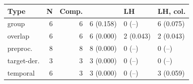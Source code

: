 \begin{tabular}{@{}lrrlll@{}}
\toprule
\textbf{Type} & \textbf{N} & \textbf{Comp.} & \textbf{\tool{}} & \textbf{LH} & \textbf{LH, col.} \\
\midrule
group & 6 & 6 & 6 (0.158) & 0 (--) & 6 (0.075) \\
overlap & 6 & 6 & 6 (0.000) & 2 (0.043) & 2 (0.043) \\
preproc. & 8 & 8 & 8 (0.000) & 0 (--) & 0 (--) \\
target-der. & 3 & 3 & 3 (0.000) & 0 (--) & 0 (--) \\
temporal & 6 & 3 & 3 (0.000) & 0 (--) & 3 (0.059) \\
\bottomrule
\end{tabular}
